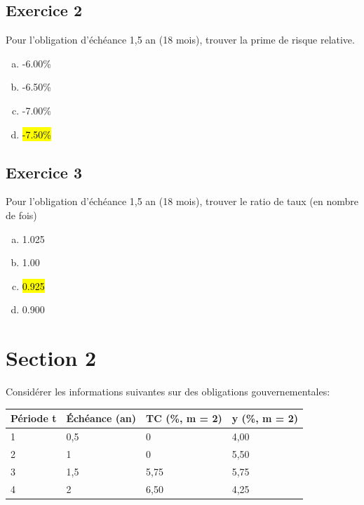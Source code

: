 \documentclass[10pt,a4paper]{article}
\begin{document}
\subsection*{Exercice 2}
Pour l'obligation d'échéance 1,5 an (18 mois),  trouver la prime de risque relative.


\begin{enumerate}[a)]
\item -6.00\%
\item -6.50\%
\item -7.00\%
\item  \hl{-7.50\%}
\end{enumerate}

\subsection*{Exercice 3}
Pour l'obligation d'échéance 1,5 an (18 mois),  trouver le ratio de taux (en nombre de fois)


\begin{enumerate}[a)]
\item 1.025
\item 1.00
\item  \hl{0.925}
\item 0.900
\end{enumerate}

\section*{Section 2}
Considérer les informations suivantes sur des obligations gouvernementales:

\begin{table}[H]
\begin{center}
\begin{tabular}{|l|l|l|l|}
\hline
Période t & Échéance (an) & TC (\%, m = 2) & y (\%, m = 2) \\ \hline
1         & 0,5           & 0              & 4,00          \\ \hline
2         & 1             & 0              & 5,50          \\ \hline
3         & 1,5           & 5,75           & 5,75          \\ \hline
4         & 2             & 6,50           & 4,25          \\ \hline
\end{tabular}
\end{center}
\end{table}
\end{document}
